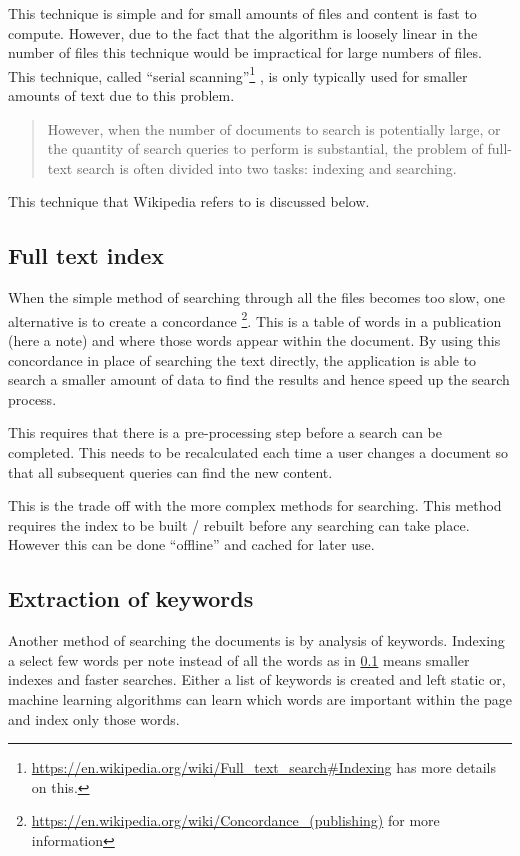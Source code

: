 This technique is simple and for small amounts of files and content is fast to
compute. However, due to the fact that the algorithm is loosely linear in the
number of files this technique would be impractical for large numbers of files.
This technique, called ``serial scanning''\footnote{%
\url{https://en.wikipedia.org/wiki/Full_text_search\#Indexing}%
has more details on this.}%
, is only typically used for smaller amounts of text due to this problem.

\blockquote{ However, when the number of documents to search is potentially
large, or the quantity of search queries to perform is substantial, the problem
of full-text search is often divided into two tasks: indexing and searching.
}\cite{wiki:full-text-search}

This technique that Wikipedia refers to is discussed below.

\subsection{Full text index}\label{full-text-index}

When the simple method of searching through all the files becomes too slow, one
alternative is to create a concordance
\footnote{\url{https://en.wikipedia.org/wiki/Concordance_(publishing)} for more
information}. This is a table of words in a publication (here a note) and where
those words appear within the document. By using this concordance in place of
searching the text directly, the application is able to search a smaller amount
of data to find the results and hence speed up the search process.

This requires that there is a pre-processing step before a search can be
completed. This needs to be recalculated each time a user changes a
document so that all subsequent queries can find the new content.

This is the trade off with the more complex methods for searching. This method
requires the index to be built / rebuilt before any searching can take place.
However this can be done ``offline'' and cached for later use.

\subsection{Extraction of keywords}\label{extraction-of-keywords}

Another method of searching the documents is by analysis of keywords. Indexing a
select few words per note instead of all the words as in \ref{full-text-index}
means smaller indexes and faster searches.
Either a list of keywords is created and left static or, machine learning
algorithms can learn which words are important within the page and index only
those words.

